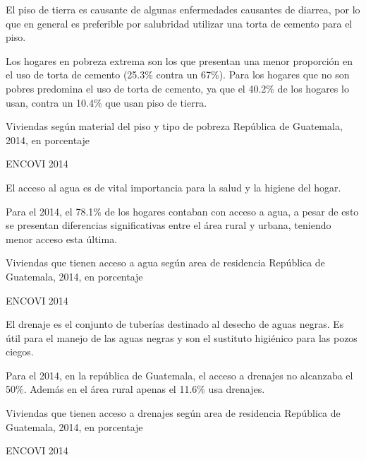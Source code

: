 
%
{%
	El piso de tierra es causante de algunas enfermedades causantes de diarrea, por lo que en general es preferible por salubridad utilizar una torta de cemento para el piso.
	
	Los hogares en   pobreza extrema son los que presentan una menor proporción en el uso de torta de cemento (25.3\% contra un 67\%). Para los hogares que no son pobres predomina el uso de torta de cemento, ya que el 40.2\% de los hogares lo usan, contra un 10.4\% que usan piso de tierra. 
}%
{%
	Viviendas según material del piso y tipo de pobreza} %
{%
	República de Guatemala, 2014, en porcentaje} %
{%
	\begin{tikzpicture}[x=1pt,y=1pt]    \end{tikzpicture}}%
{%
	ENCOVI 2014} %


%
{%
	El acceso al agua es de vital importancia para la salud y la higiene del hogar. 
	
	Para el 2014, el 78.1\% de los hogares contaban con acceso a agua, a pesar de esto se presentan diferencias significativas entre el área rural y urbana, teniendo menor acceso esta última.
}%
{%
	Viviendas que tienen acceso a agua según area de residencia} %
{%
	República de Guatemala, 2014, en porcentaje} %
{%
	\begin{tikzpicture}[x=1pt,y=1pt]    \end{tikzpicture}}%
{%
	ENCOVI 2014} %



%
{%
	El drenaje es el conjunto de tuberías destinado al desecho de aguas negras. Es útil para el manejo de las aguas negras y son el sustituto higiénico para las pozos ciegos. 
	
	Para el 2014, en la república de Guatemala, el acceso a drenajes no alcanzaba el 50\%. Además en el área rural apenas el 11.6\% usa drenajes. 
	
}%
{%
	Viviendas que tienen acceso a drenajes según area de residencia} %
{%
	República de Guatemala, 2014, en porcentaje} %
{%
	\begin{tikzpicture}[x=1pt,y=1pt]    \end{tikzpicture}}%
{%
	ENCOVI 2014} %

